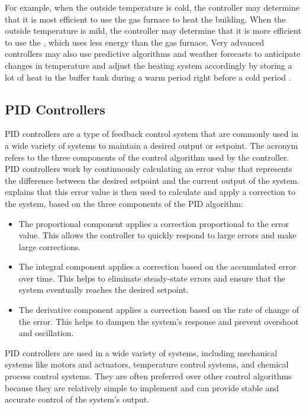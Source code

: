 For example, when the outside temperature is cold, the controller may determine that it is most efficient to use the gas furnace to heat the building. When the outside temperature is mild, the controller may determine that it is more efficient to use the \HP, which uses less energy than the gas furnace. Very advanced controllers may also use predictive algorithms and weather forecasts to anticipate changes in temperature and adjust the heating system accordingly by storing a lot of heat in the buffer tank during a warm period right before a cold period \cite{demirezen_feasibility_2021}.

\subsection{\acs{PID} Controllers}
\ac{PID} controllers are a type of feedback control system that are commonly used in a wide variety of systems to maintain a desired output or setpoint. The acronym refers to the three components of the control algorithm used by the controller. \ac{PID} controllers work by continuously calculating an error value that represents the difference between the desired setpoint and the current output of the system. \citeauthor{Rames_2012} \cite{Rames_2012} explains that this error value is then used to calculate and apply a correction to the system, based on the three components of the \ac{PID} algorithm:
\begin{itemize}
    \item The proportional component applies a correction proportional to the error value. This allows the controller to quickly respond to large errors and make large corrections.
    \item The integral component applies a correction based on the accumulated error over time. This helps to eliminate steady-state errors and ensure that the system eventually reaches the desired setpoint.
    \item The derivative component applies a correction based on the rate of change of the error. This helps to dampen the system's response and prevent overshoot and oscillation.  
\end{itemize}


\ac{PID} controllers are used in a wide variety of systems, including mechanical systems like motors and actuators, temperature control systems, and chemical process control systems. They are often preferred over other control algorithms because they are relatively simple to implement and can provide stable and accurate control of the system's output.

